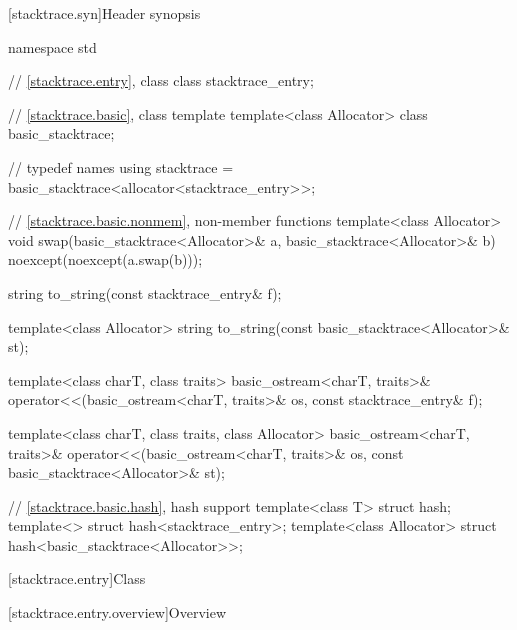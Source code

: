 [stacktrace.syn]{Header  synopsis}

%
\begin{codeblock}
namespace std {
  // \ref{stacktrace.entry}, class 
  class stacktrace_entry;

  // \ref{stacktrace.basic}, class template 
  template<class Allocator>
    class basic_stacktrace;

  //  typedef names
  using stacktrace = basic_stacktrace<allocator<stacktrace_entry>>;

  // \ref{stacktrace.basic.nonmem}, non-member functions
  template<class Allocator>
    void swap(basic_stacktrace<Allocator>& a, basic_stacktrace<Allocator>& b)
      noexcept(noexcept(a.swap(b)));

  string to_string(const stacktrace_entry& f);

  template<class Allocator>
    string to_string(const basic_stacktrace<Allocator>& st);

  template<class charT, class traits>
    basic_ostream<charT, traits>&
      operator<<(basic_ostream<charT, traits>& os, const stacktrace_entry& f);

  template<class charT, class traits, class Allocator>
    basic_ostream<charT, traits>&
      operator<<(basic_ostream<charT, traits>& os, const basic_stacktrace<Allocator>& st);

  // \ref{stacktrace.basic.hash}, hash support
  template<class T> struct hash;
  template<> struct hash<stacktrace_entry>;
  template<class Allocator> struct hash<basic_stacktrace<Allocator>>;
}
\end{codeblock}

[stacktrace.entry]{Class }

[stacktrace.entry.overview]{Overview}


